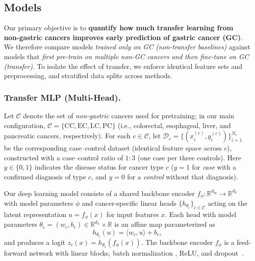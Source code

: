 \documentclass[diagnostics,article,submit,pdftex,moreauthors]{Definitions/mdpi}
\newcommand{\CC}{\mathrm{CC}}
\newcommand{\EC}{\mathrm{EC}}
\newcommand{\LC}{\mathrm{LC}}
\newcommand{\PC}{\mathrm{PC}}
\begin{document}
\subsection{Models}
Our primary objective is to \textbf{quantify how much transfer learning from non-gastric cancers improves early prediction of gastric cancer (GC)}. 
We therefore compare models \emph{trained only on GC (non-transfer baselines)} against models that \emph{first pre-train on multiple non-GC cancers and then fine-tune on GC (transfer)}.
To isolate the effect of transfer, we enforce identical feature sets and preprocessing, and stratified data splits across methods. 



\subsubsection{Transfer MLP (Multi-Head).}
Let $\mathcal{C}$ denote the set of \emph{non-gastric} cancers used for pretraining; in our main configuration, $\mathcal{C}=\{\CC,\EC,\LC,\PC\}$ (i.e., colorectal, esophageal, liver, and pancreatic cancers, respectively).
For each $c\in\mathcal{C}$, let $\mathcal{D}_c=\{(x_i^{(c)},y_i^{(c)})\}_{i=1}^{N_c}$ be the corresponding case--control dataset (identical feature space across $c$), constructed with a case--control ratio of $1{:}3$ (one case per three controls).
Here $y\in\{0,1\}$ indicates the disease status for cancer type $c$ ($y{=}1$ for \emph{case} with a confirmed diagnosis of type $c$, and $y{=}0$ for a \emph{control} without that diagnosis).

Our deep learning model consists of a shared backbone encoder $f_\phi:\mathbb{R}^{d_{\mathrm{in}}}\!\to\!\mathbb{R}^{d_h}$ with model parameters $\phi$ and cancer-specific linear heads $\{h_{\theta_c}\}_{c\in\mathcal{C}}$ acting on the latent representation $u=f_\phi(x)$ for input features $x$.
Each head with model parameters $\theta_c=(w_c,b_c)\in\mathbb{R}^{d_h}\times\mathbb{R}$ is an affine map parameterized as
\[
h_{\theta_c}(u)=\langle w_c,u\rangle + b_c,
\]
and produces a logit $z_c(x)=h_{\theta_c}(f_\phi(x))$.
The backbone encoder $f_\phi$ is a feed-forward network with linear blocks, batch normalization \citep{Ioffe2015_BN}, ReLU, and dropout~\citep{Srivastava2014_Dropout}.
\end{document}
